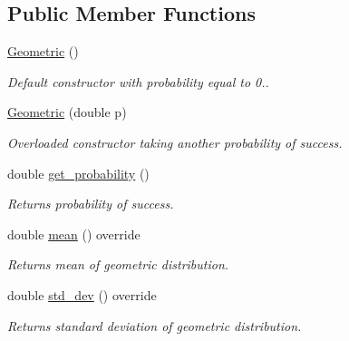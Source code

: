 \subsection*{Public Member Functions}
\begin{DoxyCompactItemize}
\item 
\mbox{\label{classGeometric_a741e184fee4d9abdeb2f565870eba117}} 
\hyperlink{classGeometric_a741e184fee4d9abdeb2f565870eba117}{Geometric} ()
\begin{DoxyCompactList}\small\item\em Default constructor with probability equal to 0.. \end{DoxyCompactList}\item 
\mbox{\label{classGeometric_a4e85b6271700782d644f56c5b90b4966}} 
\hyperlink{classGeometric_a4e85b6271700782d644f56c5b90b4966}{Geometric} (double p)
\begin{DoxyCompactList}\small\item\em Overloaded constructor taking another probability of success. \end{DoxyCompactList}\item 
\mbox{\label{classGeometric_a486dd9216795ae5ecd3579598c62632c}} 
double \hyperlink{classGeometric_a486dd9216795ae5ecd3579598c62632c}{get\+\_\+probability} ()
\begin{DoxyCompactList}\small\item\em Returns probability of success. \end{DoxyCompactList}\item 
\mbox{\label{classGeometric_a58dd5be9b9d81b2cbe5d3dc886249ec4}} 
double \hyperlink{classGeometric_a58dd5be9b9d81b2cbe5d3dc886249ec4}{mean} () override
\begin{DoxyCompactList}\small\item\em Returns mean of geometric distribution. \end{DoxyCompactList}\item 
\mbox{\label{classGeometric_af8bbace76827cee60cfa2c38c684c991}} 
double \hyperlink{classGeometric_af8bbace76827cee60cfa2c38c684c991}{std\+\_\+dev} () override
\begin{DoxyCompactList}\small\item\em Returns standard deviation of geometric distribution. \end{DoxyCompactList}\item 

\end{DoxyCompactItemize}
